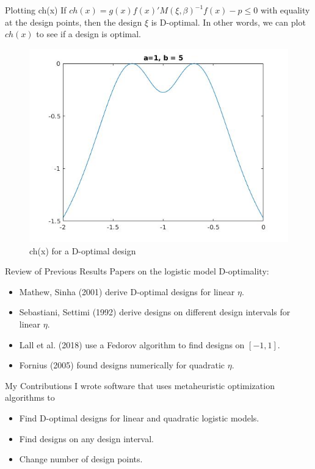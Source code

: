 \documentclass[11pt]{beamer}
\begin{document}
\begin{frame}{Plotting ch(x)}
If $ch(x) = g(x) f(x)'M(\xi, \beta)^{-1} f(x) - p \leq 0$ with equality at the design points, then the design $\xi$ is D-optimal. In other words, we can plot $ch(x)$ to see if a design is optimal.\\


\begin{figure}[h]
\centering
\includegraphics[scale=0.3]{prob3p2.jpg}
\caption{ch(x) for a D-optimal design}

\end{figure}

\end{frame}

\begin{frame}{Review of Previous Results}
Papers on the logistic model D-optimality:
\begin{itemize}
\item Mathew, Sinha (2001) derive D-optimal designs for linear $\eta$.
\item Sebastiani, Settimi (1992) derive designs on different design intervals for linear $\eta$.
\item Lall et al. (2018) use a Fedorov algorithm to find designs on $[-1,1]$.
\item Fornius (2005) found designs numerically for quadratic $\eta$.
\end{itemize}
\end{frame}

\begin{frame}{My Contributions}
I wrote software that uses metaheuristic optimization algorithms to
\begin{itemize}
\item Find D-optimal designs for linear and quadratic logistic models.
\item Find designs on any design interval.
\item Change number of design points.
\end{itemize}
\end{frame}
\end{document}
